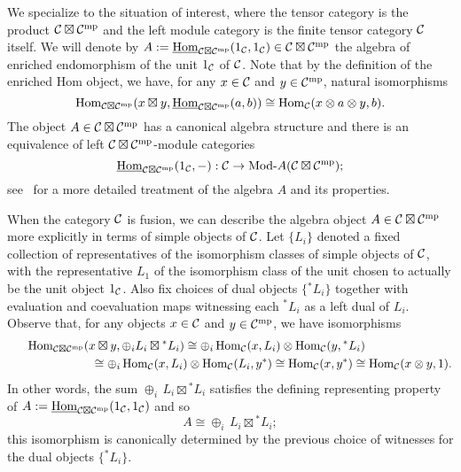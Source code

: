 \documentclass{amsart}
\begin{document}
We specialize to the situation of interest, where the tensor category is the product $\mathcal C \boxtimes \mathcal C^{\mathrm{mp}}$ and the left module category is the finite tensor category $\mathcal C$ itself.  We will denote by $A := \operatorname{\underline{Hom}}_{\mathcal C \boxtimes \mathcal C^{\mathrm{mp}}}(1_\mathcal C,1_\mathcal C) \in \mathcal C \boxtimes \mathcal C^{\mathrm{mp}}$ the algebra of enriched endomorphism of the unit $1_\mathcal C$ of $\mathcal C$.  Note that by the definition of the enriched Hom object, we have, for any $x \in \mathcal C$ and $y \in \mathcal C^{\mathrm{mp}}$, natural isomorphisms
\[
\operatorname{Hom}_{\mathcal C \boxtimes \mathcal C^{\mathrm{mp}}}(x \boxtimes y, \operatorname{\underline{Hom}}_{\mathcal C \boxtimes \mathcal C^{\mathrm{mp}}}(a,b)) \cong \operatorname{Hom}_\mathcal C(x \otimes a \otimes y,b).
\]
The object $A \in \mathcal C \boxtimes \mathcal C^{\mathrm{mp}}$ has a canonical algebra structure and there is an equivalence of left $\mathcal C \boxtimes \mathcal C^{\mathrm{mp}}$-module categories
\[
\IHom_{\cC \boxtimes \cC^\mp}(1_\cC,-) : \cC \ra \Mod{}{A}(\cC \boxtimes \cC^\mp);
\]
see~\cite[\S 2]{MR2097289} for a more detailed treatment of the algebra $A$ and its properties.

When the category $\mathcal C$ is fusion, we can describe the algebra object $A \in \mathcal C \boxtimes \mathcal C^{\mathrm{mp}}$ more explicitly in terms of simple objects of $\mathcal C$.  Let $\{L_i\}$ denoted a fixed collection of representatives of the isomorphism classes of simple objects of $\mathcal C$, with the representative $L_1$ of the isomorphism class of the unit chosen to actually be the unit object $1_\mathcal C$.  Also fix choices of dual objects $\{{}^* L_i\}$ together with evaluation and coevaluation maps witnessing each ${}^* L_i$ as a left dual of $L_i$.  Observe that, for any objects $x \in \mathcal C$ and $y \in \mathcal C^{\mathrm{mp}}$, we have isomorphisms
\[
\begin{split}
\operatorname{Hom}_{\mathcal C \boxtimes \mathcal C^{\mathrm{mp}}}( x \boxtimes y , \oplus_i L_i \boxtimes {}^* L_i)
\cong
\oplus_i \operatorname{Hom}_{\mathcal C}(x, L_i) \otimes \operatorname{Hom}_{\mathcal C}(y, {}^*L_i) \hspace*{1in}\\\hspace*{1in}
\cong
\oplus_i \operatorname{Hom}_{\mathcal C}(x, L_i) \otimes \operatorname{Hom}_{\mathcal C}(L_i, y^*)
\cong
\operatorname{Hom}_{\mathcal C}(x, y^*)
\cong
\operatorname{Hom}_{\mathcal C}(x \otimes y, 1).
\end{split}
\]
In other words, the sum $\oplus_i \, L_i \boxtimes {}^* L_i$ satisfies the defining representing property of $A := \operatorname{\underline{Hom}}_{\mathcal C \boxtimes \mathcal C^{\mathrm{mp}}}(1_\mathcal C,1_\mathcal C)$ and so
\[
A \cong \oplus_i \, L_i \boxtimes {}^* L_i;
\]
this isomorphism is canonically determined by the previous choice of witnesses for the dual objects $\{{}^* L_i\}$.
\end{document}
